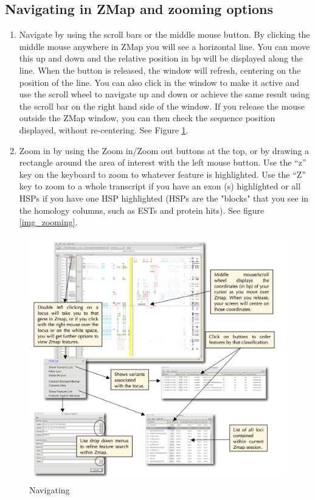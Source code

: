 \documentclass[letterpaper]{article}
\newcounter{Figure}
\begin{document}
\subsection{Navigating in ZMap and zooming options}
\begin{enumerate}
\item Navigate by using the scroll bars or the middle mouse button. By clicking the middle mouse anywhere in ZMap you will see a horizontal line. You can move this up and down and the relative position in bp will be displayed along the line. When the button is released, the window will refresh, centering on the position of the line. You can also click in the window to make it active and use the scroll wheel to navigate up and down or achieve the same result using the scroll bar on the right hand side of the window. If you release the mouse outside the ZMap window, you can then check the sequence position displayed, without re-centering. See Figure \ref{img_navigating}.
\item Zoom in by using the Zoom in/Zoom out buttons at the top, or by drawing a rectangle around the area of interest with the left mouse button. Use the ``z'' key on the keyboard to zoom to whatever feature is highlighted. Use the ``Z'' key to zoom to a whole transcript if you have an exon (s) highlighted or all HSPs if you have one HSP highlighted (HSPs are the "blocks" that you see in the homology columns, such as ESTs and protein hits). See figure \ref{img_zooming}.
\end{enumerate}

\begin{figure}
\centering
\color[rgb]{0.30980393,0.5058824,0.7411765}
\includegraphics[width=15.231cm]{img_navigating.png}
\caption{Navigating}
\label{img_navigating}
\end{figure}
\end{document}
